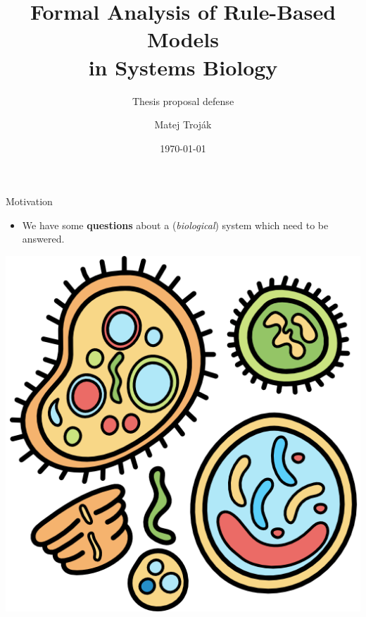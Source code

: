 \documentclass[10pt]{beamer}
\title[Formal Analysis of Rule-Based
Models in Systems Biology]{Formal Analysis of Rule-Based
Models\\ in Systems Biology}
\subtitle{Thesis proposal defense}
\date{\today}
\author[Matej Troj\'{a}k]{ Matej Troj\'{a}k}
\begin{document}
\thispagestyle{empty}
\maketitle


\begin{frame}[fragile]{Motivation}

\begin{minipage}{0.55\textwidth}
\begin{itemize}
	\item We have some \textbf{questions} about a (\emph{biological}) system which need to be answered.
\end{itemize}
\end{minipage}
\hfill
\begin{minipage}{0.44\textwidth}
\begin{center}
\includegraphics[scale=0.15]{pics/bacteria.png}
\end{center}
\end{minipage}



\end{frame}
\end{document}
